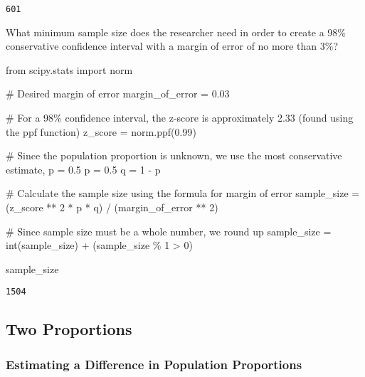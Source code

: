 \documentclass[
  letterpaper,
  DIV=11,
  numbers=noendperiod]{scrartcl}
\newenvironment{Shaded}{\begin{snugshade}}{\end{snugshade}}
\newcommand{\BuiltInTok}[1]{\textcolor[rgb]{0.00,0.23,0.31}{#1}}
\newcommand{\CommentTok}[1]{\textcolor[rgb]{0.37,0.37,0.37}{#1}}
\newcommand{\DecValTok}[1]{\textcolor[rgb]{0.68,0.00,0.00}{#1}}
\newcommand{\FloatTok}[1]{\textcolor[rgb]{0.68,0.00,0.00}{#1}}
\newcommand{\ImportTok}[1]{\textcolor[rgb]{0.00,0.46,0.62}{#1}}
\newcommand{\NormalTok}[1]{\textcolor[rgb]{0.00,0.23,0.31}{#1}}
\newcommand{\OperatorTok}[1]{\textcolor[rgb]{0.37,0.37,0.37}{#1}}
\begin{document}
\begin{verbatim}
601
\end{verbatim}

What minimum sample size does the researcher need in order to create a
98\% conservative confidence interval with a margin of error of no more
than 3\%?

\begin{Shaded}
\begin{Highlighting}[]
\ImportTok{from}\NormalTok{ scipy.stats }\ImportTok{import}\NormalTok{ norm}

\CommentTok{\# Desired margin of error}
\NormalTok{margin\_of\_error }\OperatorTok{=} \FloatTok{0.03}

\CommentTok{\# For a 98\% confidence interval, the z{-}score is approximately 2.33 (found using the ppf function)}
\NormalTok{z\_score }\OperatorTok{=}\NormalTok{ norm.ppf(}\FloatTok{0.99}\NormalTok{)}

\CommentTok{\# Since the population proportion is unknown, we use the most conservative estimate, p = 0.5}
\NormalTok{p }\OperatorTok{=} \FloatTok{0.5}
\NormalTok{q }\OperatorTok{=} \DecValTok{1} \OperatorTok{{-}}\NormalTok{ p}

\CommentTok{\# Calculate the sample size using the formula for margin of error}
\NormalTok{sample\_size }\OperatorTok{=}\NormalTok{ (z\_score }\OperatorTok{**} \DecValTok{2} \OperatorTok{*}\NormalTok{ p }\OperatorTok{*}\NormalTok{ q) }\OperatorTok{/}\NormalTok{ (margin\_of\_error }\OperatorTok{**} \DecValTok{2}\NormalTok{)}

\CommentTok{\# Since sample size must be a whole number, we round up}
\NormalTok{sample\_size }\OperatorTok{=} \BuiltInTok{int}\NormalTok{(sample\_size) }\OperatorTok{+}\NormalTok{ (sample\_size }\OperatorTok{\%} \DecValTok{1} \OperatorTok{\textgreater{}} \DecValTok{0}\NormalTok{)}

\NormalTok{sample\_size}
\end{Highlighting}
\end{Shaded}

\begin{verbatim}
1504
\end{verbatim}

\hypertarget{two-proportions}{%
\subsection{Two Proportions}\label{two-proportions}}

\hypertarget{estimating-a-difference-in-population-proportions}{%
\subsubsection{Estimating a Difference in Population
Proportions}\label{estimating-a-difference-in-population-proportions}}
\end{document}
